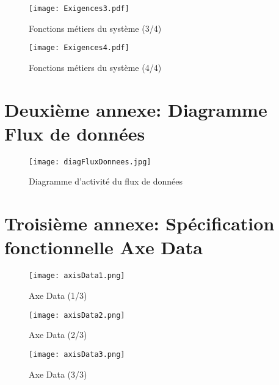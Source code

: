 \documentclass[12pt,fleqn]{book} %
\begin{document}
\begin{figure}[h!]
\centering\texttt{[image: Exigences3.pdf]}
\caption{\label{fig:exi3} Fonctions métiers du système (3/4)}
\end{figure}

\begin{figure}[h!]
\centering\texttt{[image: Exigences4.pdf]}
\caption{\label{fig:exi4} Fonctions métiers du système (4/4)}
\end{figure}

\chapter{Deuxième annexe: Diagramme Flux de données}

\begin{figure}[h!]
\centering\texttt{[image: diagFluxDonnees.jpg]}
\caption{\label{fig:donnees} Diagramme d'activité du flux de données}
\end{figure}

\chapter{Troisième annexe: Spécification fonctionnelle Axe Data}

\begin{figure}[h!]
\centering\texttt{[image: axisData1.png]}
\caption{\label{fig:axeData1} Axe Data (1/3)}
\end{figure}

\begin{figure}[h!]
\centering\texttt{[image: axisData2.png]}
\caption{\label{fig:axeData2} Axe Data (2/3)}
\end{figure}

\begin{figure}[h!]
\centering\texttt{[image: axisData3.png]}
\caption{\label{fig:axeData3} Axe Data (3/3)}
\end{figure}

\backmatter %

%


\nocite{*}
\end{document}
